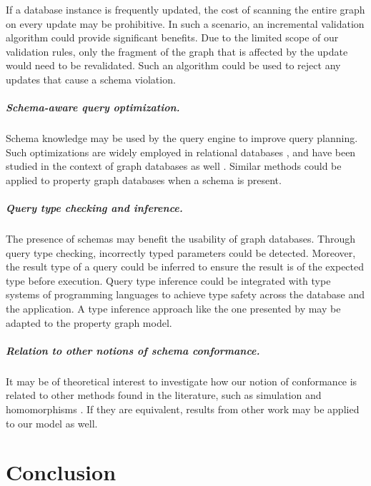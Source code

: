 \documentclass{report}
\theoremstyle{definition}
\begin{document}
If a database instance is frequently updated, the cost of scanning the entire graph on every update may be prohibitive. In such a scenario, an incremental validation algorithm could provide significant benefits. Due to the limited scope of our validation rules, only the fragment of the graph that is affected by the update would need to be revalidated. Such an algorithm could be used to reject any updates that cause a schema violation.

\paragraph{Schema-aware query optimization.} Schema knowledge may be used by the query engine to improve query planning. Such optimizations are widely employed in relational databases \citep{chakravarthy1990logic, meier2013semantic,silberschatz2011database}, and have been studied in the context of graph databases as well \citep{buneman1997adding,popa1999equational}. Similar methods could be applied to property graph databases when a schema is present.

\paragraph{Query type checking and inference.} The presence of schemas may benefit the usability of graph databases. Through query type checking, incorrectly typed parameters could be detected. Moreover, the result type of a query could be inferred to ensure the result is of the expected type before execution. Query type inference could be integrated with type systems of programming languages to achieve type safety across the database and the application. A type inference approach like the one presented by \citet{colazzo2015typing} may be adapted to the property graph model.

\paragraph{Relation to other notions of schema conformance.} It may be of theoretical interest to investigate how our notion of conformance is related to other methods found in the literature, such as simulation \citep{buneman1997adding} and homomorphisms \citep{bonifati2019schema}. If they are equivalent, results from other work may be applied to our model as well.

\chapter{Conclusion}
\label{ch:conclusion}
\end{document}
